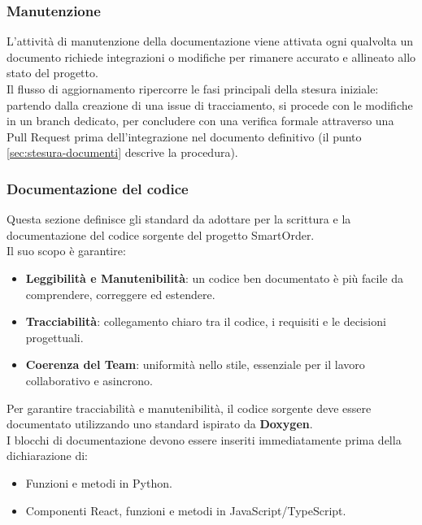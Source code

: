 \subsubsection{Manutenzione}
L'attività di manutenzione della documentazione viene attivata ogni qualvolta un documento richiede integrazioni o modifiche per rimanere accurato e allineato allo stato del progetto.\\
Il flusso di aggiornamento ripercorre le fasi principali della stesura iniziale: partendo dalla creazione di una issue di tracciamento, si procede con le modifiche in un branch dedicato, per concludere con una verifica formale attraverso una Pull Request prima dell'integrazione nel documento definitivo (il punto \ref{sec:stesura-documenti} descrive la procedura).

\subsubsection{Documentazione del codice}
Questa sezione definisce gli standard da adottare per la scrittura e la documentazione del codice sorgente del progetto SmartOrder.\\ 
Il suo scopo è garantire:
\begin{itemize}[itemsep=3pt, parsep=1pt, label=$\scriptstyle\bullet$]
    \item \textbf{Leggibilità e Manutenibilità}: un codice ben documentato è più facile da comprendere, correggere ed estendere.
    \item \textbf{Tracciabilità}: collegamento chiaro tra il codice, i requisiti e le decisioni progettuali.
    \item \textbf{Coerenza del Team}: uniformità nello stile, essenziale per il lavoro collaborativo e asincrono.
\end{itemize}

Per garantire tracciabilità e manutenibilità, il codice sorgente deve essere documentato utilizzando uno standard ispirato da \textbf{Doxygen}.\\
I blocchi di documentazione devono essere inseriti immediatamente prima della dichiarazione di:
\begin{itemize}[itemsep=3pt, parsep=1pt, label=$\scriptstyle\bullet$]
    \item Funzioni e metodi in Python.
    \item Componenti React, funzioni e metodi in JavaScript/TypeScript.
\end{itemize}

